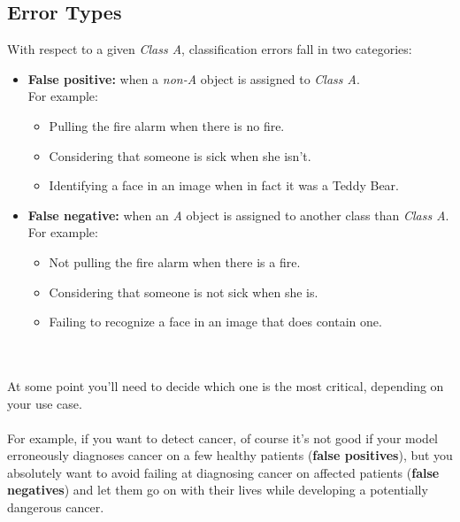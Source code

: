 \subsection*{Error Types}
With respect to a given \textit{Class A}, classification errors fall in two categories:
\begin{itemize}
    \item \textbf{False positive:} when a \textit{non-A} object is assigned to \textit{Class A}.\\
      For example:
      \begin{itemize}
          \item Pulling the fire alarm when there is no fire.
          \item Considering that someone is sick when she isn't.
          \item Identifying a face in an image when in fact it was a Teddy Bear.
      \end{itemize}
    
    \item \textbf{False negative:} when an \textit{A} object is assigned to another class than \textit{Class A}.\\
      For example:
      \begin{itemize}
          \item Not pulling the fire alarm when there is a fire.
          \item Considering that someone is not sick when she is.
          \item Failing to recognize a face in an image that does contain one.
      \end{itemize}
\end{itemize}
\bigskip
{}\\
\\
At some point you'll need to decide which one is the most critical, depending on your use case.\\
\\
For example, if you want to detect cancer, of course it's not good if your model 
erroneously diagnoses cancer on a few healthy patients (\textbf{false positives}), 
but you absolutely want to avoid failing at diagnosing cancer on affected patients (\textbf{false negatives}) 
and let them go on with their lives while developing a potentially dangerous cancer.\\

